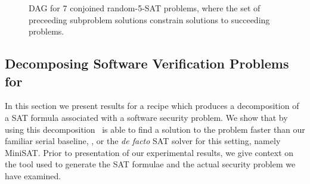 \documentclass[
10pt, %
a4paper, %
oneside, %
headinclude,footinclude, %
BCOR5mm, %
]{scrartcl}
\begin{document}
\begin{figure}[h]
\centering
{}
\caption[DAG for 7 conjoined random-5-SAT problems]{DAG for 7 conjoined random-5-SAT problems, where the set of preceeding subproblem solutions constrain solutions to succeeding problems.}\label{fig:dag_example431asf5}
\end{figure}





\clearpage
\subsection{Decomposing Software Verification Problems for \dagster}\label{section:software_verification}

In this section we present results for a recipe which produces a decomposition of a SAT formula associated with a software security problem.
We show that by using this decomposition \dagster\ is able to find a solution to the problem faster than our familiar serial baseline, \tinisat, or the {\em de facto} SAT solver for this setting, namely {\textsc MiniSAT}.
Prior to presentation of our experimental results, we give context on the tool used to generate the SAT formulae and the actual security problem we have examined.
\end{document}
